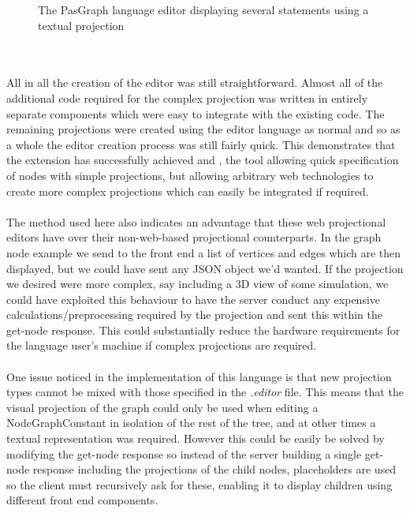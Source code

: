 \documentclass{article}
\begin{document}
{\begin{figure}[h!]
  \caption{The PasGraph language editor displaying several statements using a textual projection}
  \label{fig:pasgraphUI1}
\end{figure}
\\
\\
All in all the creation of the editor was still straightforward. Almost all of the additional code required for the complex projection was written in entirely separate components which were easy to integrate with the existing code. The remaining projections were created using the editor language as normal and so as a whole the editor creation process was still fairly quick. This demonstrates that the extension has successfully achieved \RSetup and \RCustom, the tool allowing quick specification of nodes with simple projections, but allowing arbitrary web technologies to create more complex projections which can easily be integrated if required. 
\\
\\
The method used here also indicates an advantage that these web projectional editors have over their non-web-based projectional counterparts. In the graph node example we send to the front end a list of vertices and edges which are then displayed, but we could have sent any JSON object we'd wanted. If the projection we desired were more complex, say including a 3D view of some simulation, we could have exploited this behaviour to have the server conduct any expensive calculations/preprocessing required by the projection and sent this within the get-node response. This could substantially reduce the hardware requirements for the language user's machine if complex projections are required.
\\
\\
One issue noticed in the implementation of this language is that new projection types cannot be mixed with those specified in the \emph{.editor} file. This means that the visual projection of the graph could only be used when editing a NodeGraphConstant in isolation of the rest of the tree, and at other times a textual representation was required. However this could be easily be solved by modifying the get-node response so instead of the server building a single get-node response including the projections of the child nodes, placeholders are used so the client must recursively ask for these, enabling it to display children using different front end components.
%
%
}
\end{document}
